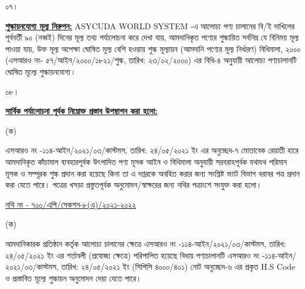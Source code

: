 \documentclass[12pt]{article}
\newcommand{\fileno}{নথি নং - ৭০০/এপি/সেকশন-৮(এ)/২০২১-২০২২}
\newcommand{\filenou}{
\begin{minipage}[t]{0.57\linewidth}
\hspace{1em}
\end{minipage}
\begin{minipage}[t]{0.43\linewidth}
\underline{\fileno}
\end{minipage}
}
\newcommand{\srooof}{এসআরও নং -১১৪-আইন/২০২১/০৩/কাস্টমস}
\newcommand{\srooofd}{তারিখ: ২৪/০৫/২০২১ ইং}
\newcommand{\cpc}{(সিপিসি ৪০০০/৪০১)}
\newcommand{\nfpage}{
\newpage
{\filenou}
}
\begin{document}
\normalsize
\begin{minipage}[t]{0.05\linewidth}
০৭।
\end{minipage}
\begin{minipage}[t]{0.95\linewidth}
\underline{\textbf{শুল্কায়নযোগ্য মূল্য নিরুপন:}} ASYCUDA WORLD SYSTEM
-এ আলোচ্য পণ্য চালানের বি/ই দাখিলের পূর্ববর্তী ৯০ (নব্বই) দিনের
মূল্য তথ্য পর্যালোচনা করে দেখা যায়, আমদানিকৃত
পণ্যের শুল্কায়িত সর্বনিম্ন যে বিনিময় মূল্য পাওয়া যায়, উক্ত মূল্য অপেক্ষা ঘোষিত মূল্য বেশি হওয়ায়
শুল্ক মূল্যায়ন (আমদানি পণ্যের মূল্য নির্ধারণ) বিধিমালা,
২০০০ (এসআরও নং- ৫৭/আইন/২০০০/১৮২১/শুল্ক, তারিখ: ২৩/০২/২০০০)
এর বিধি-৪ অনুযায়ী আলোচ্য পণ্যচালানটি ঘোষিত
মূল্যে শুল্কায়নযোগ্য।
\end{minipage}
\begin{minipage}[t]{0.05\linewidth}
০৮।
\end{minipage}
\begin{minipage}[t]{0.95\linewidth}
\underline{\textbf{সার্বিক পর্যালোচনা পূর্বক নিম্নোক্ত প্রস্তাব উপস্থাপন করা হলো:}}
\end{minipage}
\begin{minipage}[t]{0.05\linewidth}
\hspace{0em}
\end{minipage}
\begin{minipage}[t]{0.05\linewidth}
(ক)
\end{minipage}
\begin{minipage}[t]{0.90\linewidth}
{\srooof}, {\srooofd}
এর অনুচ্ছেদ-৭ মোতাবেক রেয়াতী হারে
আমদানিকৃত কাঁচামাল ব্যবহারপূর্বক
উৎপাদিত পণ্য মূসক আইন ও বিধিমালা
অনুযায়ী সরবরাহপূর্বক যথাযথ পরিমান মূসক
ও সম্পূরক শুল্ক প্রদান করা হয়েছে কিনা তা এ
দপ্তরকে অবহিত করার জন্য সংশ্লিষ্ট ভ্যাট বিভাগ
বরাবর পত্র প্রদান করা যেতে পারে।
পত্রের খসড়া প্রস্তুতপূর্বক অনুমোদন/স্বাক্ষরের জন্য
নথির পত্রাংশে সংযুক্ত করা হলো।
\end{minipage}
{\nfpage}
\begin{minipage}[t]{0.05\linewidth}
\hspace{0em}
\end{minipage}
\begin{minipage}[t]{0.05\linewidth}
(ক)
\end{minipage}
\begin{minipage}[t]{0.90\linewidth}
আমদানিকারক প্রতিষ্ঠান কর্তৃক আলোচ্য চালানের
ক্ষেত্রে
{\srooof}, {\srooofd}
এর শর্তাবলী (প্রযোজ্য ক্ষেত্রে) পরিপালিত হয়েছে
বিধায় পণ্যচালানটি {\srooof}, {\srooofd}
{\cpc} নোট অনুচ্ছেদ-৬ এর প্রকৃত H.S Code
ও প্রস্তাবিত মূল্যে শুল্কায়ন অনুমোদন দেয়া যেতে পারে।
\end{minipage}



\thispagestyle{laststyle}
\end{document}
